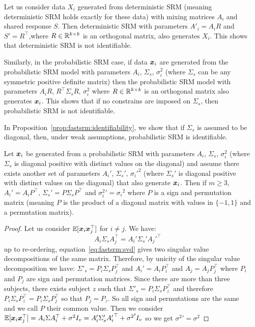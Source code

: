 Let us consider data $X_i$ generated from deterministic SRM (meaning
deterministic SRM holds exactly for these data) with
mixing matrices $A_i$ and shared response $S$.
Then deterministic SRM with parameters $A'_i = A_i R$ and $S' = R^{\top}$,where
$R \in \mathbb{R}^{k \times k}$ is an orthogonal matrix, also
generates $X_i$.
This shows that deterministic SRM is not identifiable.

Similarly, in the probabilistic SRM case, if data $\boldsymbol{x}_i$ are generated from the
probabilistic SRM model with 
parameters $A_i$, $\Sigma_s$, $\sigma_i^2$ (where $\Sigma_s$ can be any
symmetric positive definite
matrix) then the probabilistic SRM model with parameters $A_iR$, $R^{\top} \Sigma_s R$, $\sigma_i^2$  where
$R \in \mathbb{R}^{k \times k}$ is an orthogonal matrix also generates $\boldsymbol{x}_i$.
This shows that if no constrains are imposed on $\Sigma_s$,
then probabilistic SRM is not identifiable.


In Proposition~\ref{prop:fastsrm:identifiability}, we show that if $\Sigma_s$ is assumed to be diagonal, then, under weak assumptions, probabilistic
SRM is identifiable.
\begin{proposition}
  \label{prop:fastsrm:identifiability}
  Let $\boldsymbol{x}_i$ be generated from a probabilistic SRM with parameters 
  $A_i$, $\Sigma_s$, $\sigma_i^2$ (where $\Sigma_s$ is diagonal positive with
  distinct values on the diagonal) and assume there exists another set of parameters $A_i'$, $\Sigma_s'$,
  ${\sigma_i'}^2$ (where $\Sigma_s'$ is diagonal positive with
  distinct values on the diagonal) that also generate $\boldsymbol{x}_i$.
Then if $m\geq 3$, $A_i' = A_i P^{\top}$, $\Sigma_s'= P\Sigma_sP^{\top}$ and
  ${\sigma_i^2}' = {\sigma_i}^2$ where $P$ is a sign and permutation matrix
  (meaning $P$ is the product of a diagonal matrix with values in $\{-1, 1\}$
  and a permutation matrix).
\end{proposition}
\begin{proof}
  Let us consider $\mathbb{E}[\boldsymbol{x}_i \boldsymbol{x}_j^{\top}]$ for $i \neq j$.
  We have:
  \begin{equation}
  A_i \Sigma_s A_j^{\top} = A_i' \Sigma_s' {A_j'}^{\top}
  \label{eq:fastsrm:svd}
  \end{equation}
  up to re-ordering, equation~\eqref{eq:fastsrm:svd} gives two singular value
  decompositions of the same matrix.
  Therefore, by unicity of the singular value decomposition we have:
  $\Sigma'_s = P_i \Sigma_s P_j^{\top}$ and $A_i' = A_i P_i^{\top}$ and $A_j =
  A_j P_j^{\top}$ where $P_i$ and $P_j$ are sign and permutation matrices.
  Since there are more than three subjects, there exists subject $z$ such that
  $\Sigma'_s = P_i \Sigma_s P_z^{\top}$ and therefore
  $P_i \Sigma_s P_z^{\top} =  P_i \Sigma_s P_j^{\top}$ so that $P_j =
  P_z$. So all sign and permutations are the same and we call $P$ their
  common value.
  Then we consider
  $\mathbb{E}[\boldsymbol{x}_i \boldsymbol{x}_j^{\top}] = A_i \Sigma A_i^{\top} + \sigma^2 I_v = A_i' \Sigma_s'
  {A_i'}^{\top} + {\sigma^2}' I_v$
  so we get ${\sigma^2}' = {\sigma^2}$
\end{proof}

